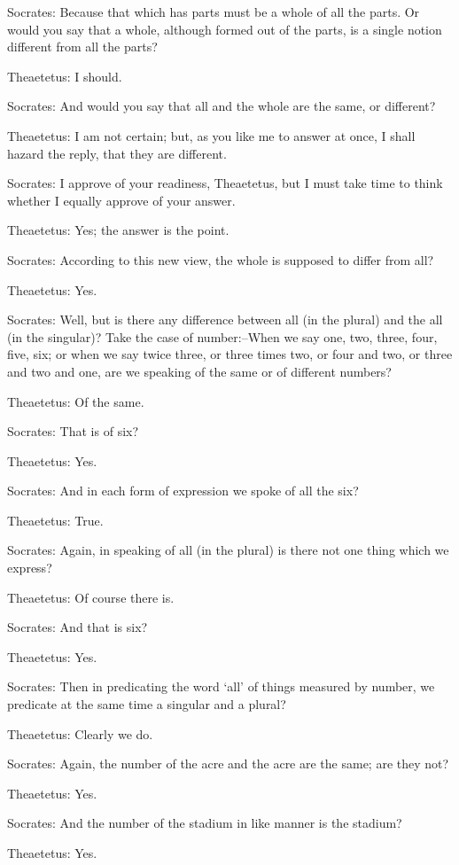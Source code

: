 Socrates: Because that which has parts must be a whole of all the parts.
Or would you say that a whole, although formed out of the parts, is a
single notion different from all the parts?

Theaetetus: I should.

Socrates: And would you say that all and the whole are the same, or
different?

Theaetetus: I am not certain; but, as you like me to answer at once, I
shall hazard the reply, that they are different.

Socrates: I approve of your readiness, Theaetetus, but I must take time
to think whether I equally approve of your answer.

Theaetetus: Yes; the answer is the point.

Socrates: According to this new view, the whole is supposed to differ
from all?

Theaetetus: Yes.

Socrates: Well, but is there any difference between all (in the plural)
and the all (in the singular)? Take the case of number:--When we say
one, two, three, four, five, six; or when we say twice three, or three
times two, or four and two, or three and two and one, are we speaking of
the same or of different numbers?

Theaetetus: Of the same.

Socrates: That is of six?

Theaetetus: Yes.

Socrates: And in each form of expression we spoke of all the six?

Theaetetus: True.

Socrates: Again, in speaking of all (in the plural) is there not one
thing which we express?

Theaetetus: Of course there is.

Socrates: And that is six?

Theaetetus: Yes.

Socrates: Then in predicating the word `all' of things measured by
number, we predicate at the same time a singular and a plural?

Theaetetus: Clearly we do.

Socrates: Again, the number of the acre and the acre are the same; are
they not?

Theaetetus: Yes.

Socrates: And the number of the stadium in like manner is the stadium?

Theaetetus: Yes.

